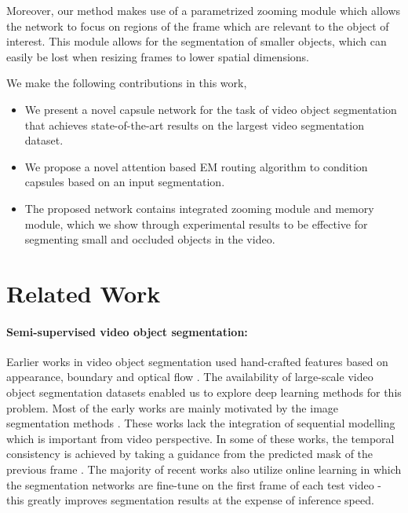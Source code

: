 \documentclass[10pt,twocolumn,letterpaper]{article}
\begin{document}
Moreover, our method makes use of a parametrized zooming module which allows the network to focus on regions of the frame which are relevant to the object of interest. This module allows for the segmentation of smaller objects, which can easily be lost when resizing frames to lower spatial dimensions.

We make the following contributions in this work,
\begin{itemize}
    \item We present a novel capsule network for the task of video object segmentation that achieves state-of-the-art results on the largest video segmentation dataset.
    \item We propose a novel attention based EM routing algorithm to condition capsules based on an input segmentation.
    \item The proposed network contains integrated zooming module and memory module, which we show through experimental results to be effective for segmenting small and occluded objects in the video.
\end{itemize}

\section{Related Work}

\paragraph{Semi-supervised video object segmentation:} 
Earlier works in video object segmentation used hand-crafted features based on appearance, boundary and optical flow \cite{brox2010object, faktor2014video, jain2014supervoxel, Nagaraja_2015_ICCV, papazoglou2013fast}. The availability of large-scale video object segmentation datasets \cite{pont20172017, xu2018youtube2} enabled us to explore deep learning methods for this problem. Most of the early works are mainly motivated by the image segmentation methods \cite{chen2018deeplab, xu2016deep, long2015fully}. These works \cite{caelles2017one, cheng2017segflow, jain2017fusionseg, perazzi2016benchmark, yang2018efficient} lack the integration of sequential modelling which is important from video perspective. In some of these works, the temporal consistency is achieved by taking a guidance from the predicted mask of the previous frame \cite{hu2017maskrnn, perazzi2016benchmark, yang2018efficient}. The majority of recent works also utilize online learning \cite{caelles2017one} in which the segmentation networks are fine-tune on the first frame of each test video - this greatly improves segmentation results at the expense of inference speed. 
\end{document}
